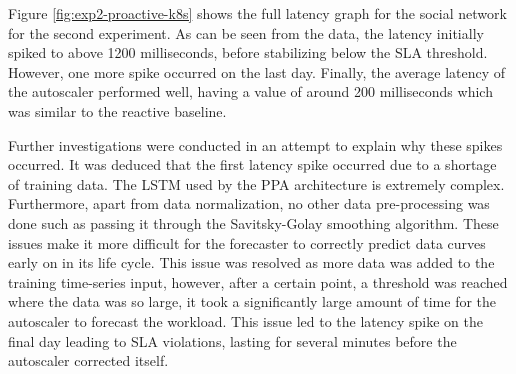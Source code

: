\begin{center}
\begin{minipage}{\linewidth}
    \label{fig:exp2-proactive-k8s}
\end{minipage}
\end{center}

Figure \ref{fig:exp2-proactive-k8s} shows the full latency graph for the social network for the second experiment. As can be seen from the data, the latency initially spiked to above 1200 milliseconds, before stabilizing below the SLA threshold. However, one more spike occurred on the last day. Finally, the average latency of the autoscaler performed well, having a value of around 200 milliseconds which was similar to the reactive baseline.\par

Further investigations were conducted in an attempt to explain why these spikes occurred. It was deduced that the first latency spike occurred due to a shortage of training data. The LSTM used by the PPA architecture is extremely complex. Furthermore, apart from data normalization, no other data pre-processing was done such as passing it through the Savitsky-Golay smoothing algorithm. These issues make it more difficult for the forecaster to correctly predict data curves early on in its life cycle. This issue was resolved as more data was added to the training time-series input, however, after a certain point, a threshold was reached where the data was so large, it took a significantly large amount of time for the autoscaler to forecast the workload. This issue led to the latency spike on the final day leading to SLA violations, lasting for several minutes before the autoscaler corrected itself.\par

